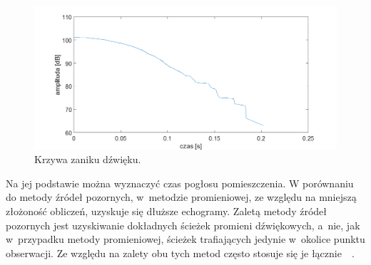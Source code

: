 \begin{figure}[H]
        \centering
                \centering
                \includegraphics[width=16cm]{rys6}
	\caption{Krzywa zaniku dźwięku.}
\end{figure}

Na jej podstawie można wyznaczyć czas pogłosu pomieszczenia. W porównaniu do metody źródeł pozornych, w~metodzie promieniowej, ze względu na mniejszą złożoność obliczeń, uzyskuje się dłuższe echogramy. Zaletą metody źródeł pozornych jest uzyskiwanie dokładnych ścieżek promieni dźwiękowych, a~nie, jak w~przypadku metody promieniowej, ścieżek trafiających jedynie w~okolice punktu obserwacji. Ze względu na zalety obu tych metod często stosuje się je łącznie~\cite{b13}~\cite{b14}.















